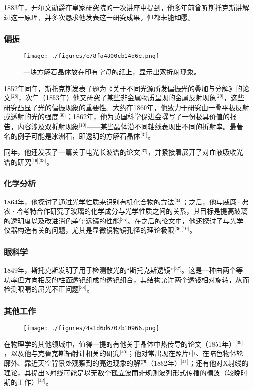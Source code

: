 1883年，开尔文勋爵在皇家研究院的一次讲座中提到，他多年前曾听斯托克斯讲解过这一原理，并多次恳求他发表这一研究成果，但都未能如愿。
\subsubsection{偏振}
\begin{figure}[ht]
\centering
\texttt{[image: ./figures/e78fa4800cb14d6e.png]}
\caption{一块方解石晶体放在印有字母的纸上，显示出双折射现象。} \label{fig_QZstks_4}
\end{figure}
1852年同年，斯托克斯发表了题为《关于不同光源所发偏振光的叠加与分解》的论文\(^\text{[28]}\)，次年（1853年）他又研究了某些非金属物质呈现的金属反射现象\(^\text{[29]}\)，这些研究凸显了光的偏振现象的重要性。大约在1860年，他致力于研究由一叠平板反射或透射的光的强度\(^\text{[30]}\)；1862年，他为英国科学促进会撰写了一份极具价值的报告，内容涉及双折射现象\(^\text{[10]}\)——某些晶体沿不同轴线表现出不同的折射率。最著名的例子可能是冰洲石，即透明的方解石晶体\(^\text{[31]}\)。

同年，他还发表了一篇关于电光长波谱的论文\(^\text{[32]}\)，并紧接着展开了对血液吸收光谱的研究\(^\text{[10][33]}\)。
\subsubsection{化学分析}
1864年，他探讨了通过光学性质来识别有机化合物的方法\(^\text{[34]}\)；之后，他与威廉·弗农·哈考特合作研究了玻璃的化学成分与光学性质之间的关系，其目标是提高玻璃的透明度以及改进消色差望远镜的性能\(^\text{[35]}\)。在之后的论文中，他还探讨了与光学仪器构造有关的问题，尤其是显微镜物镜孔径的理论极限\(^\text{[36][10]}\)。
\subsubsection{眼科学}
1849年，斯托克斯发明了用于检测散光的“斯托克斯透镜”\(^\text{[37]}\)。这是一种由两个等功率但方向相反的柱面透镜组成的透镜组合，其结构允许两个透镜相对旋转，从而检测眼睛的屈光不正问题\(^\text{[38]}\)。
\subsubsection{其他工作}
\begin{figure}[ht]
\centering
\texttt{[image: ./figures/4a1d6d6707b10966.png]}
\caption{} \label{fig_QZstks_5}
\end{figure}
在物理学的其他领域中，值得一提的有他关于晶体中热传导的论文（1851年）\(^\text{[39]}\)，以及他与克鲁克斯辐射计相关的研究\(^\text{[40]}\)；他对常出现在照片中、在暗色物体轮廓外、靠近天空背景处观察到的亮边现象的解释（1882年）\(^\text{[41]}\)；还有他对X射线的理论，其提出X射线可能是以无数个孤立波而非规则波列形式传播的横波（较晚时期的工作）\(^\text{[42]}\)。

